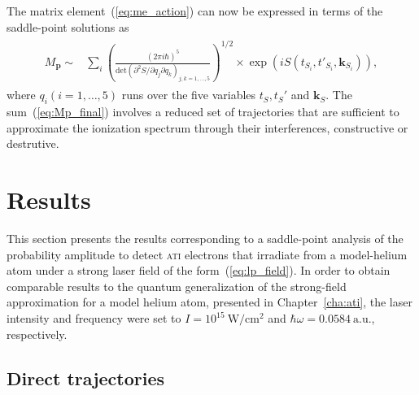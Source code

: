 The matrix element~(\ref{eq:me_action}) can now be expressed in terms
of the saddle-point solutions as~\cite{KopoldOptComm2000}
\begin{eqnarray}
\label{eq:Mp_final}
\begin{split}
M_{\mathbf{p}} \sim & \sum\limits_{i} \left( \frac{(2\pi i \hbar)^{5}}
{\mathrm{det} (\partial^{2}S / \partial q_{j} \partial q_{k})_{j,k = 1, \dots, 5}}
\right)^{1/2} \times \exp(i S(t_{S_{i}}, t'_{S_{i}}, \mathbf{k}_{S_{i}})),
\end{split}
\end{eqnarray}
where $q_{i}(i = 1,\dots,5)$ runs over the five variables $t_{S},
t_{S}'$ and $\mathbf{k}_{S}$. The sum~(\ref{eq:Mp_final}) involves a
reduced set of trajectories that are sufficient to approximate the
ionization spectrum through their interferences, constructive or
destrutive.


\section{\label{sec:spa_results} Results}

This section presents the results corresponding to a saddle-point
analysis of the probability amplitude to detect \textsc{ati} electrons
that irradiate from a model-helium atom under a strong laser field of
the form~(\ref{eq:lp_field}). In order to obtain comparable results to
the quantum generalization of the strong-field approximation for a
model helium atom, presented in Chapter~\ref{cha:ati}, the laser
intensity and frequency were set to $I = 10^{15}\ \mathrm{W/cm^{2}}$
and $\hbar\omega = 0.0584\ \mathrm{a.u.}$, respectively.

\subsection{\label{sec:spa_direct} Direct trajectories}

